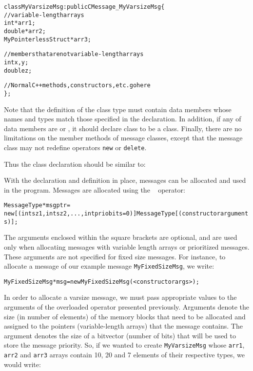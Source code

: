 \begin{alltt}
class MyVarsizeMsg : public CMessage_MyVarsizeMsg \{
  // variable-length arrays
  int *arr1;
  double *arr2;
  MyPointerlessStruct *arr3;
  
  // members that are not variable-length arrays 
  int x,y;
  double z;

  // Normal C++ methods, constructors, etc. go here
\};
\end{alltt}

Note that the  definition of the class type must contain data members
whose names and types match those specified in the  declaration.  In
addition, if any of data members are  or , it should
declare class  to be a  class.  Finally,
there are no limitations on the member methods of message classes, except that
the message class may not redefine operators \texttt{new} or \texttt{delete}.


Thus the  class
declaration should be similar to:

\medskip
{}
With the  declaration and  definition in place, messages can be allocated and 
used in the program.
Messages are allocated using the \CC\  operator:

\begin{alltt}
 MessageType *msgptr =
  new [(int sz1, int sz2, ... , int priobits=0)] MessageType[(constructor arguments)];
\end{alltt}

The arguments enclosed within the square brackets are optional, and 
are used only when allocating messages
with variable length arrays or prioritized messages.
These arguments are not specified for fixed size messages. 
For instance, to allocate a message of our example message 
{\tt MyFixedSizeMsg}, we write:

\begin{alltt}
MyFixedSizeMsg *msg = new MyFixedSizeMsg(<constructor args>);
\end{alltt}

In order to allocate a varsize message, we must pass appropriate
values to the arguments of the overloaded  operator presented previously. 
Arguments 
denote the size (in number of elements) of the memory blocks that need to be
allocated and assigned to the pointers (variable-length arrays) that the message contains. The
 argument denotes the size of a bitvector (number of bits) that
will be used to store the message priority.   
So, if we wanted to create {\tt MyVarsizeMsg} whose 
{\tt arr1},  {\tt arr2} and {\tt arr3} arrays contain
10, 20 and 7 elements of their respective types, we would write:


